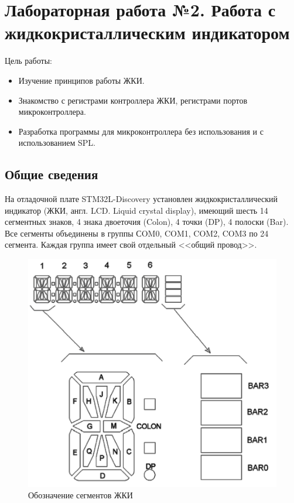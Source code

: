 \chapter{Лабораторная работа №2. Работа с жидкокристаллическим индикатором}
Цель работы: 
\begin{itemize}
\item Изучение принципов работы ЖКИ.
\item Знакомство с регистрами контроллера ЖКИ, регистрами портов микроконтроллера.
\item Разработка программы для микроконтроллера без использования и с использованием SPL.
\end{itemize}

\section{Общие сведения}

На отладочной плате STM32L-Discovery установлен жидкокристаллический индикатор (ЖКИ, англ. LCD. Liquid crystal display), имеющий шесть 14 сегментных знаков, 4 знака двоеточия (Colon), 4 точки (DP), 4 полоски (Bar). Все сегменты объединены в группы СOM0, COM1, COM2, COM3 по 24 сегмента. Каждая группа имеет свой отдельный <<общий провод>>.

\begin{figure}[h!]
\begin{center}
\includegraphics[scale=0.4]{Image/23.jpg}
\end{center}

\caption{Обозначение сегментов ЖКИ}
\end{figure}

